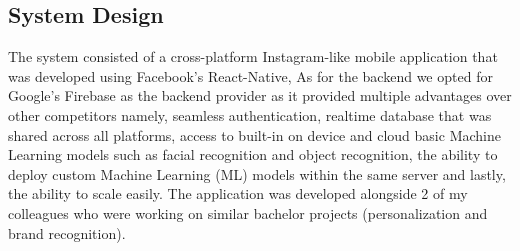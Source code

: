 \subsection{System Design}
The system consisted of a cross-platform Instagram-like mobile application that was developed using Facebook's React-Native, As for the backend we opted for Google's Firebase as the backend provider as it provided multiple advantages over other competitors namely, seamless authentication,
realtime database that was shared across all platforms, access to built-in on device and cloud basic Machine Learning models such as facial recognition and object recognition, the ability to deploy custom Machine Learning (ML) models within the same server and lastly, the ability to scale easily.
The application was developed alongside 2 of my colleagues who were working on similar bachelor projects (personalization and brand recognition).


